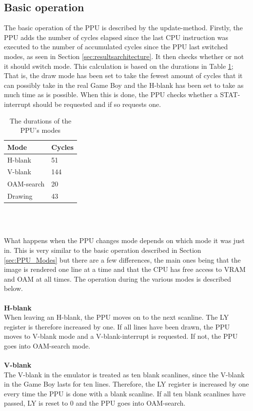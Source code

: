 \subsection{Basic operation}
The basic operation of the PPU is described by the update-method. Firstly, the PPU adds the number of cycles elapsed since the last CPU instruction was executed to the number of accumulated cycles since the PPU last switched modes, as seen in Section \ref{sec:resultsarchitecture}. It then checks whether or not it should switch mode. This calculation is based on the durations in Table \ref{tab:PPU_mode_durations}; That is, the draw mode has been set to take the fewest amount of cycles that it can possibly take in the real Game Boy and the H-blank has been set to take as much time as is possible. When this is done, the PPU checks whether a STAT-interrupt should be requested and if so requests one.
\begin{table}[H]
    \centering
\begin{tabular}{l|l}
    \textbf{Mode} & \textbf{Cycles} \\
    \hline
    H-blank & 51\\
    V-blank & 144\\
    OAM-search & 20\\
    Drawing & 43
\end{tabular}
\\\
    \caption{The durations of the PPU's modes}
    \label{tab:PPU_mode_durations}
\end{table}
What happens when the PPU changes mode depends on which mode it was just in. This is very similar to the basic operation described in Section \ref{sec:PPU_Modes} but there are a few differences, the main ones being that the image is rendered one line at a time and that the CPU has free access to VRAM and OAM at all times. The operation during the various modes is described below.\\
\\
\newpage
\textbf{H-blank}\\
When leaving an H-blank, the PPU moves on to the next scanline. The LY register is therefore increased by one. If all lines have been drawn, the PPU moves to V-blank mode and a V-blank-interrupt is requested. If not, the PPU goes into OAM-search mode.\\
\\
\textbf{V-blank}\\
The V-blank in the emulator is treated as ten blank scanlines, since the V-blank in the Game Boy lasts for ten lines. Therefore, the LY register is increased by one every time the PPU is done with a blank scanline. If all ten blank scanlines have passed, LY is reset to 0 and the PPU goes into OAM-search.\\
